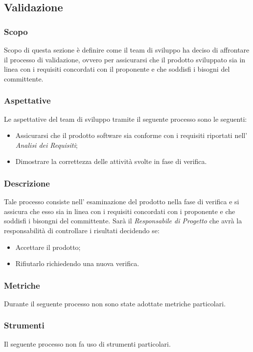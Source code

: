\subsection{Validazione}\label{subsection: validazione}
\subsubsection{Scopo}
Scopo di questa sezione è definire come il team di sviluppo ha deciso di affrontare il processo di validazione, ovvero per assicurarsi che il prodotto sviluppato sia in linea con i requisiti concordati con il proponente e che soddisfi i bisogni del committente.
\subsubsection{Aspettative}
Le aspettative del team di sviluppo tramite il seguente processo sono le seguenti: 
\begin{itemize}
    \item Assicurarsi che il prodotto software sia conforme con i requisiti riportati nell' \textit{Analisi dei Requisiti};
    \item  Dimostrare la correttezza delle attività svolte in fase di verifica.
\end{itemize}
\subsubsection{Descrizione}
Tale processo consiste nell' esaminazione del prodotto nella fase di verifica e si assicura che esso sia in linea con i requisiti concordati con i proponente e che soddisfi i bisongni del committente.
Sarà il \textit{Responsabile di Progetto} che avrà la responsabilità di controllare i risultati decidendo se:
\begin{itemize}
    \item Accettare il prodotto;
    \item Rifiutarlo richiedendo una nuova verifica.
\end{itemize}    
\subsubsection{Metriche}
Durante il seguente processo non sono state adottate metriche particolari.
\subsubsection{Strumenti}
Il seguente processo non fa uso di strumenti particolari.


